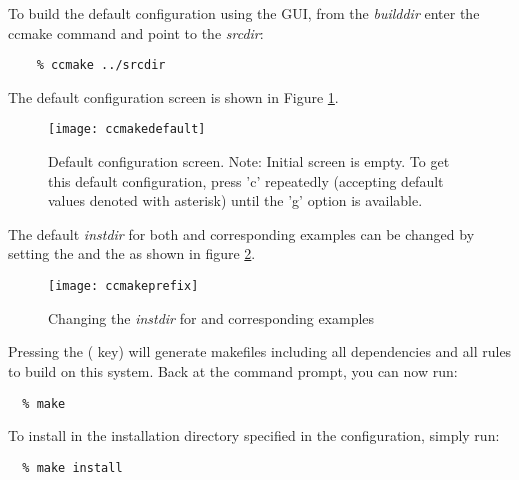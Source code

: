 To build the default configuration using the GUI, from the {\em builddir} enter
the ccmake command and point to the {\em srcdir}:

\begin{verbatim}
    % ccmake ../srcdir
\end{verbatim}

The default configuration screen is shown in Figure
\ref{f:ccmakedefault}. 
\begin{figure}[!ht]
{\centerline{\texttt{[image: ccmakedefault]}}}
\caption [Initial {\em ccmake} configuration screen]
{Default configuration screen. Note: Initial screen is empty.
To get this default configuration, press 'c' repeatedly (accepting default values denoted with asterisk)
until the 'g' option is available.}
\label{f:ccmakedefault}
\end{figure}

The default {\em instdir} for both {\sundials} and corresponding examples
can be changed by setting the  and
the  as shown in figure
\ref{f:ccmakeprefix}. 
\begin{figure}[!ht]
{\centerline{\texttt{[image: ccmakeprefix]}}}
\caption [Changing the {\em instdir}]
{Changing the {\em instdir} for {\sundials} and
corresponding {\id examples} }
\label{f:ccmakeprefix}
\end{figure}

Pressing the ( key) will generate makefiles including all dependencies
and all rules to build {\sundials} on this system. 
Back at the command prompt, you can now run:

\begin{verbatim}
  % make
\end{verbatim}

To install {\sundials} in the installation directory specified in the configuration, simply run:

\begin{verbatim}
  % make install
\end{verbatim}


